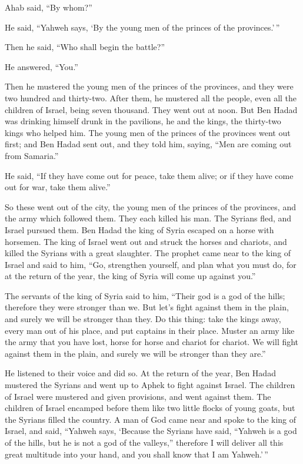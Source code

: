  Ahab said, ``By whom?''

He said, ``Yahweh says, `By the young men of the princes of the
provinces.'\,''

Then he said, ``Who shall begin the battle?''

He answered, ``You.''

 Then he mustered the young men of the princes of the
provinces, and they were two hundred and thirty-two. After them, he
mustered all the people, even all the children of Israel, being seven
thousand.  They went out at noon. But Ben Hadad was
drinking himself drunk in the pavilions, he and the kings, the
thirty-two kings who helped him.  The young men of the
princes of the provinces went out first; and Ben Hadad sent out, and
they told him, saying, ``Men are coming out from Samaria.''

 He said, ``If they have come out for peace, take them
alive; or if they have come out for war, take them alive.''

 So these went out of the city, the young men of the
princes of the provinces, and the army which followed them.
 They each killed his man. The Syrians fled, and Israel
pursued them. Ben Hadad the king of Syria escaped on a horse with
horsemen.  The king of Israel went out and struck the
horses and chariots, and killed the Syrians with a great slaughter.
 The prophet came near to the king of Israel and said to
him, ``Go, strengthen yourself, and plan what you must do, for at the
return of the year, the king of Syria will come up against you.''

 The servants of the king of Syria said to him, ``Their god
is a god of the hills; therefore they were stronger than we. But let's
fight against them in the plain, and surely we will be stronger than
they.  Do this thing: take the kings away, every man out of
his place, and put captains in their place.  Muster an army
like the army that you have lost, horse for horse and chariot for
chariot. We will fight against them in the plain, and surely we will be
stronger than they are.''

He listened to their voice and did so.  At the return of
the year, Ben Hadad mustered the Syrians and went up to Aphek to fight
against Israel.  The children of Israel were mustered and
given provisions, and went against them. The children of Israel encamped
before them like two little flocks of young goats, but the Syrians
filled the country.  A man of God came near and spoke to
the king of Israel, and said, ``Yahweh says, `Because the Syrians have
said, ``Yahweh is a god of the hills, but he is not a god of the
valleys,'' therefore I will deliver all this great multitude into your
hand, and you shall know that I am Yahweh.'\,''

